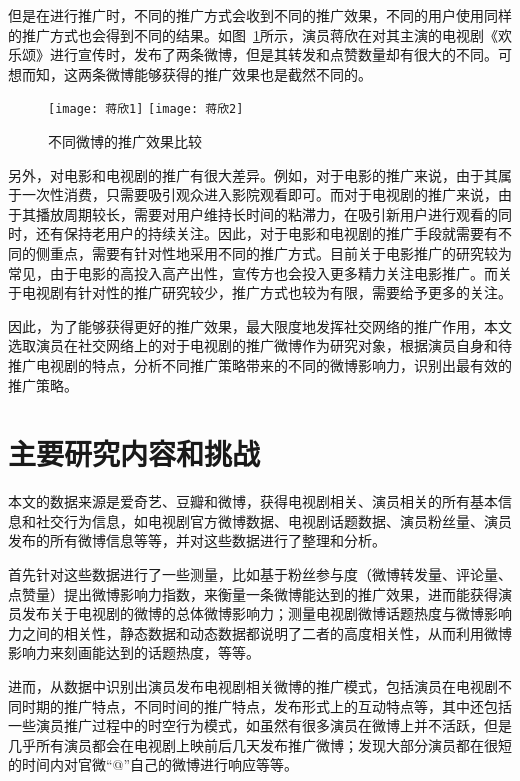 但是在进行推广时，不同的推广方式会收到不同的推广效果，不同的用户使用同样的推广方式也会得到不同的结果。如图~\ref{蒋欣}所示，演员蒋欣在对其主演的电视剧《欢乐颂》进行宣传时，发布了两条微博，但是其转发和点赞数量却有很大的不同。可想而知，这两条微博能够获得的推广效果也是截然不同的。

\begin{figure}[h]
  \centering%
    {\texttt{[image: 蒋欣1]}}
      {\texttt{[image: 蒋欣2]}}
  \caption{不同微博的推广效果比较}
  \label{蒋欣}
\end{figure}

另外，对电影和电视剧的推广有很大差异。例如，对于电影的推广来说，由于其属于一次性消费，只需要吸引观众进入影院观看即可。而对于电视剧的推广来说，由于其播放周期较长，需要对用户维持长时间的粘滞力，在吸引新用户进行观看的同时，还有保持老用户的持续关注。因此，对于电影和电视剧的推广手段就需要有不同的侧重点，需要有针对性地采用不同的推广方式。目前关于电影推广的研究较为常见，由于电影的高投入高产出性，宣传方也会投入更多精力关注电影推广。而关于电视剧有针对性的推广研究较少，推广方式也较为有限，需要给予更多的关注。

因此，为了能够获得更好的推广效果，最大限度地发挥社交网络的推广作用，本文选取演员在社交网络上的对于电视剧的推广微博作为研究对象，根据演员自身和待推广电视剧的特点，分析不同推广策略带来的不同的微博影响力，识别出最有效的推广策略。

\section{主要研究内容和挑战}

本文的数据来源是爱奇艺、豆瓣和微博，获得电视剧相关、演员相关的所有基本信息和社交行为信息，如电视剧官方微博数据、电视剧话题数据、演员粉丝量、演员发布的所有微博信息等等，并对这些数据进行了整理和分析。

首先针对这些数据进行了一些测量，比如基于粉丝参与度（微博转发量、评论量、点赞量）提出微博影响力指数，来衡量一条微博能达到的推广效果，进而能获得演员发布关于电视剧的微博的总体微博影响力；测量电视剧微博话题热度与微博影响力之间的相关性，静态数据和动态数据都说明了二者的高度相关性，从而利用微博影响力来刻画能达到的话题热度，等等。

进而，从数据中识别出演员发布电视剧相关微博的推广模式，包括演员在电视剧不同时期的推广特点，不同时间的推广特点，发布形式上的互动特点等，其中还包括一些演员推广过程中的时空行为模式，如虽然有很多演员在微博上并不活跃，但是几乎所有演员都会在电视剧上映前后几天发布推广微博；发现大部分演员都在很短的时间内对官微“@”自己的微博进行响应等等。

